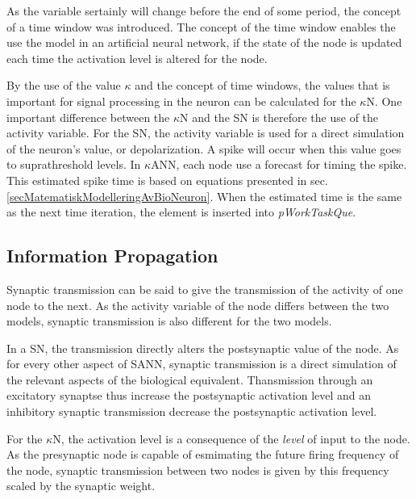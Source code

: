 	As the variable sertainly will change before the end of some period, the concept of a time window was introduced.
	The concept of the time window enables the use the model in an artificial neural network, if the state of the node is updated each time the activation level is altered for the node.

	By the use of the value $\kappa$ and the concept of time windows, the values that is important for signal processing in the neuron can be calculated for the $\kappa$N.
	One important difference between the $\kappa$N and the SN is therefore the use of the activity variable.
	For the SN, the activity variable is used for a direct simulation of the neuron's value, or depolarization.
	A spike will occur when this value goes to suprathreshold levels.
	In $\kappa$ANN, each node use a forecast for timing the spike.
	This estimated spike time is based on equations presented in sec. \ref{secMatematiskModelleringAvBioNeuron}. %
	When the estimated time is the same as the next time iteration, the element is inserted into \emph{pWorkTaskQue}.


	\subsection{Information Propagation}
	Synaptic transmission can be said to give the transmission of the activity of one node to the next.
	As the activity variable of the node differs between the two models, synaptic transmission is also different for the two models.

	In a SN, the transmission directly alters the postsynaptic value of the node.
	As for every other aspect of SANN, synaptic transmission is a direct simulation of the relevant aspects of the biological equivalent.
	Thansmission through an excitatory synaptse thus increase the postsynaptic activation level and an inhibitory synaptic transmission decrease the postsynaptic activation level.

	For the $\kappa$N, the activation level is a consequence of the \emph{level} of input to the node.
	As the presynaptic node is capable of esmimating the future firing frequency of the node, synaptic transmission between two nodes is given by this frequency scaled by the synaptic weight.

